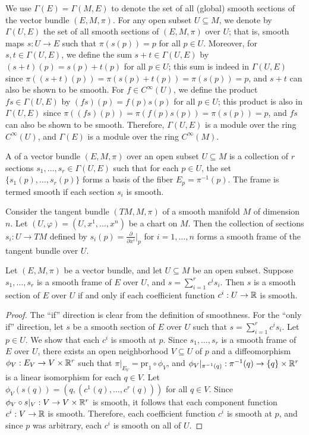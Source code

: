 We use $\Gamma(E) = \Gamma(M,E)$ to denote the set of all (global) smooth sections of the vector bundle $(E,M,\pi)$. For any open subset $U \subseteq M$, we denote by $\Gamma(U,E)$ the set of all smooth sections of $(E,M,\pi)$ over $U$; that is, smooth maps $s:U \to E$ such that $\pi(s(p)) = p$ for all $p \in U$. Moreover, for $s,t \in \Gamma(U,E)$, we define the sum $s+t \in \Gamma(U,E)$ by $(s+t)(p) = s(p) + t(p)$ for all $p \in U$; this sum is indeed in $\Gamma(U,E)$ since $\pi((s+t)(p)) = \pi(s(p) + t(p)) = \pi(s(p)) = p$, and $s+t$ can also be shown to be smooth. For $f \in C^{\infty}(U)$, we define the product $fs \in \Gamma(U,E)$ by $(fs)(p) = f(p)s(p)$ for all $p \in U$; this product is also in $\Gamma(U,E)$ since $\pi((fs)(p)) = \pi(f(p)s(p)) = \pi(s(p)) = p$, and $fs$ can also be shown to be smooth. Therefore, $\Gamma(U,E)$ is a module over the ring $C^{\infty}(U)$, and $\Gamma(E)$ is a module over the ring $C^{\infty}(M)$.

\begin{definition}
    A  of a vector bundle $(E,M,\pi)$ over an open subset $U \subseteq M$ is a collection of $r$ sections $s_{1},\ldots,s_{r} \in \Gamma(U,E)$ such that for each $p \in U$, the set $\{s_{1}(p),\ldots,s_{r}(p)\}$ forms a basis of the fiber $E_{p} = \pi^{-1}(p)$. The frame is termed smooth if each section $s_{i}$ is smooth. 
\end{definition}

Consider the tangent bundle $(TM,M,\pi)$ of a smooth manifold $M$ of dimension $n$. Let $(U,\varphi) = (U,x^{1},\ldots,x^{n})$ be a chart on $M$. Then the collection of sections $s_{i}:U \to TM$ defined by $s_{i}(p) = \frac{\partial}{\partial x^{i}}\big|_{p}$ for $i = 1,\ldots,n$ forms a smooth frame of the tangent bundle over $U$.

\begin{lemma}
    Let $(E,M,\pi)$ be a vector bundle, and let $U \subseteq M$ be an open subset. Suppose $s_{1},\ldots,s_{r}$ is a smooth frame of $E$ over $U$, and $s = \sum_{i=1}^{r} c^{i} s_{i}$. Then $s$ is a smooth section of $E$ over $U$ if and only if each coefficient function $c^{i}:U \to \mathbb{R}$ is smooth.
\end{lemma}
\begin{proof}
    The ``if'' direction is clear from the definition of smoothness. For the ``only if'' direction, let $s$ be a smooth section of $E$ over $U$ such that $s = \sum_{i=1}^{r} c^{i} s_{i}$. Let $p \in U$. We show that each $c^{i}$ is smooth at $p$. Since $s_{1},\ldots,s_{r}$ is a smooth frame of $E$ over $U$, there exists an open neighborhood $V \subseteq U$ of $p$ and a diffeomorphism $\phi_{V}: E_{V} \to V \times \mathbb{R}^{r}$ such that $\pi|_{E_{V}} = \text{pr}_{1} \circ \phi_{V}$, and $\phi_{V}|_{\pi^{-1}(q)}: \pi^{-1}(q) \to \{q\} \times \mathbb{R}^{r}$ is a linear isomorphism for each $q \in V$. Let $\phi_{V}(s(q)) = (q, (c^{1}(q),\ldots,c^{r}(q)))$ for all $q \in V$. Since $\phi_{V} \circ s|_{V}: V \to V \times \mathbb{R}^{r}$ is smooth, it follows that each component function $c^{i}: V \to \mathbb{R}$ is smooth. Therefore, each coefficient function $c^{i}$ is smooth at $p$, and since $p$ was arbitrary, each $c^{i}$ is smooth on all of $U$.
\end{proof}

